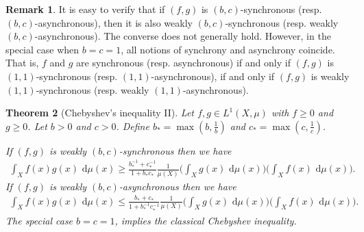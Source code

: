 \documentclass[12pt, reqno]{amsart}%
\theoremstyle{plain}  %
\newtheorem{theorem}{Theorem}[section]
\theoremstyle{definition}  %
\newtheorem{remark}[theorem]{Remark}   %
\theoremstyle{remark}
\numberwithin{equation}{section}
\renewcommand{\d}{\,\mathrm{d}}
\begin{document}
\begin{remark}
It is easy to verify that if $(f, g)$ is $(b, c)$-synchronous (resp. $(b, c)$-asynchronous), then it is also weakly $(b, c)$-synchronous (resp. weakly $(b, c)$-asynchronous). The converse does not generally hold.
However, in the special case when $b = c = 1$, all notions of synchrony and asynchrony coincide. That is, $f$ and $g$ are synchronous (resp. asynchronous) if and only if $(f, g)$ is $(1,1)$-synchronous (resp. $(1,1)$-asynchronous), if and only if $(f, g)$ is weakly $(1,1)$-synchronous (resp. weakly $(1,1)$-asynchronous).
\end{remark}

\begin{theorem}[Chebyshev's inequality II]
\label{thm:cheby-weak-sync}
Let $f,g \in L^1(X,\mu)$ with $f\geq 0$ and $g \geq 0$. Let $b>0$ and $c>0$. Define $b_{*}=\max(b,\tfrac{1}{b})$ and $c_{*}=\max(c,\tfrac{1}{c})$.

If $(f,g)$ is  weakly $(b,c)$-synchronous then we have
\begin{align*}
\int_X f(x) g(x)\,\d\mu(x) \geq \frac{b^{-1}_{*}+c^{-1}_{*}}{1+b_{*}c_{*}}\frac{1}{\mu(X)} \Big(\int_X g(x)\,\d\mu(x)\Big)\Big(\int_X f(x)\,\d\mu(x)\Big).
\end{align*}
If $(f,g)$ is weakly $(b,c)$-asynchronous then we have
\begin{align*}
\int_X f(x) g(x)\,\d\mu(x) \leq \frac{b_{*}+c_{*}}{1+b^{-1}_{*}c^{-1}_{*}}\frac{1}{\mu(X)}\Big(\int_X g(x)\,\d\mu(x)\Big)\Big(\int_X f(x)\,\d\mu(x)\Big).
\end{align*}
The special case $b = c = 1$, implies the classical Chebyshev inequality.
\end{theorem}
\end{document}
